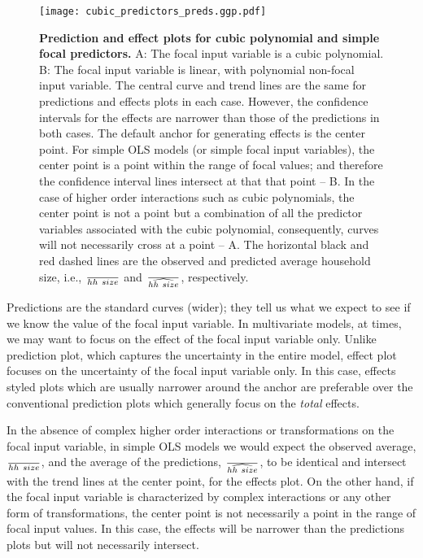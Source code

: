 \begin{figure}
\begin{center}
\texttt{[image: cubic\_predictors\_preds.ggp.pdf]}
\end{center}
\caption{{\bf Prediction and effect plots for cubic polynomial and simple focal predictors.} A: The focal input variable is a cubic polynomial. B: The focal input variable is linear, with polynomial non-focal input variable. The central curve and trend lines are the same for predictions and effects plots in each case. However, the confidence intervals for the effects are narrower than those of the predictions in both cases. The default anchor for generating effects is the center point. For simple OLS models (or simple focal input variables), the center point is a point within the range of focal values; and therefore the confidence interval lines intersect at that that point -- B. In the case of higher order interactions such as cubic polynomials, the center point is not a point but a combination of all the predictor variables associated with the cubic polynomial, consequently, curves will not necessarily cross at a point -- A. The horizontal black and red dashed lines are the observed and predicted average household size, i.e., $\over{hh~size}$ and $\over{\widehat{hh~size}}$, respectively.}
\label{fig:pred_cubic_plots}
\end{figure}

Predictions are the standard curves (wider); they tell us what we expect to see if we know the value of the focal input variable. In multivariate models, at times, we may want to focus on the effect of the focal input variable only. Unlike prediction plot, which captures the uncertainty in the entire model, effect plot focuses on the uncertainty of the focal input variable only. In this case, effects styled plots which are usually narrower around the anchor are preferable over the conventional prediction plots which generally focus on the \emph{total} effects. 

In the absence of complex higher order interactions or transformations on the focal input variable, in simple OLS models we would expect the observed average, $\over{hh~size}$, and the average of the predictions, $\over{\widehat{hh~size}}$, to be identical and intersect with the trend lines at the center point, for the effects plot. On the other hand, if the focal input variable is characterized by complex interactions or any other form of transformations, the center point is not necessarily a point in the range of focal input values. In this case, the effects will be narrower than the predictions plots but will not necessarily intersect. 


